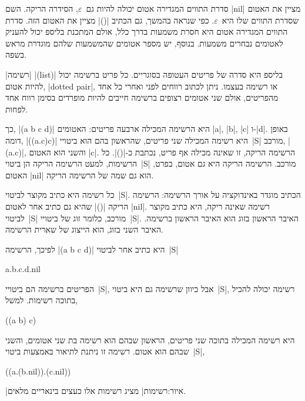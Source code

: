 סדרת התווים המגדירה אטום יכולה להיות גם~$ε$, הסידרה הריקה. השם \E|nil| מציין את
האטום שסדרת התווים שלו היא~$ε$. כפי שנראה בהמשך, גם הכתיב \E|()| מציין את האטום
הזה. סדרת התווים המגדירה אטום היא חסרת משמעות בדרך כלל, אולם המתכנת בליספ יכול
להעניק לאטומים נבחרים משמעות. בנוסף, יש מספר אטומים שהמשמעות שלהם מוגדרת מראש
בשפה.

\ע|רשימה| \E|(list)| בליספ היא סדרה של פריטים העטופה בסוגריים. כל פריט ברשימה
יכול להיות אטום, \E|dotted pair|, או רשימה בעצמו. ניתן לכתוב רווחים לפני ואחרי
כל אחד מהפריטים, אולם שני אטומים רצופים ברשימה חייבים להיות מופרדים בסימן רווח
אחד לפחות.

כך, \E|(a b c d)| היא הרשימה המכילה ארבעה פריטים: האטומים \E|a|, \E|b|, \E|c|
ו-\E|d|. באופן דומה, \E|((a.c)c)| היא רשימה המכילה שני פריטים, שהראשון בהם הוא
ביטויי~\E|S| מורכב, \E|(a.c)|, והשני הוא האטום \E|c|. הרשימה הריקה, זו שאינה
מכילה אף פריט, נכתבת כ-\E|()|. כל הרשימות, למעט הרשימה הריקה הן ביטוי~\E|S|
מורכב. הרשימה הריקה היא גם אטום, בפרט, האטום \E|nil| הוא גם שמה של הרשימה
הריקה.

כל רשימה היא כתיב מקוצר לביטוי~\E|S|. הכתיב מוגדר באינדוקציה על אורך הרשימה:
הרשימה הריקה \E|()| שהיא גם כתיב אחר לאטום \E|nil|. רשימה שאינה ריקה, היא כתיב
מקוצר לביטוי~\E|S| מורכב, כלומר זוג של ביטויי~\E|S|. האיבר הראשון בזוג הוא
האיבר הראשון ברשימה. האיבר השני בזוג, הוא הייצוג של שארית הרשימה.

לפיכך, הרשימה \E|(a b c d)| היא כתיב אחר לביטוי~\E|S|
\begin{LISP}
a.b.c.d.nil
\end{LISP}

הפריטים ברשימה הם ביטויי~\E|S|, אבל כיוון שרשימה גם היא ביטוי~\E|S|, רשימה
יכולה להכיל בתוכה רשימות. למשל,
\begin{LISP}
  ((a b) c)
\end{LISP}
היא רשימה המכילה בתוכה שני פריטים, הראשון שבהם הוא רשימה בת שני אטומים, והשני
שבהם הוא אטום. רשימה זו ניתנת לתיאור באמצעות ביטוי~\E|S|,
\begin{LISP}
  ((a.(b.nil)).(c.nil))
\end{LISP}
|איור:רשימות| מציג רשימות אלו כעצים בינאריים מלאים.

